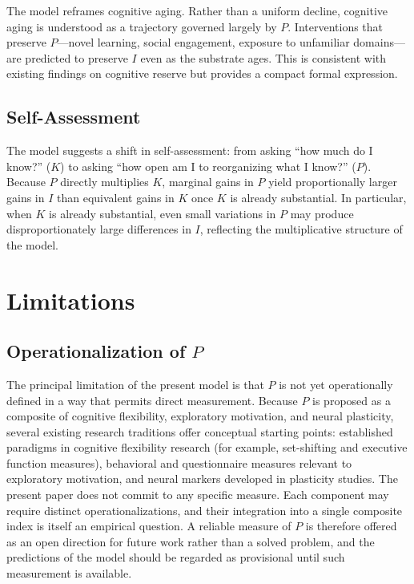 \documentclass[11pt, a4paper]{article}
\begin{document}
The model reframes cognitive aging. Rather than a uniform decline, cognitive aging is understood as a trajectory governed largely by $P$. Interventions that preserve $P$---novel learning, social engagement, exposure to unfamiliar domains---are predicted to preserve $I$ even as the substrate ages. This is consistent with existing findings on cognitive reserve but provides a compact formal expression.

\subsection{Self-Assessment}

The model suggests a shift in self-assessment: from asking ``how much do I know?'' ($K$) to asking ``how open am I to reorganizing what I know?'' ($P$). Because $P$ directly multiplies $K$, marginal gains in $P$ yield proportionally larger gains in $I$ than equivalent gains in $K$ once $K$ is already substantial. In particular, when $K$ is already substantial, even small variations in $P$ may produce disproportionately large differences in $I$, reflecting the multiplicative structure of the model.

\section{Limitations}

\subsection{Operationalization of $P$}

The principal limitation of the present model is that $P$ is not yet operationally defined in a way that permits direct measurement. Because $P$ is proposed as a composite of cognitive flexibility, exploratory motivation, and neural plasticity, several existing research traditions offer conceptual starting points: established paradigms in cognitive flexibility research (for example, set-shifting and executive function measures), behavioral and questionnaire measures relevant to exploratory motivation, and neural markers developed in plasticity studies. The present paper does not commit to any specific measure. Each component may require distinct operationalizations, and their integration into a single composite index is itself an empirical question. A reliable measure of $P$ is therefore offered as an open direction for future work rather than a solved problem, and the predictions of the model should be regarded as provisional until such measurement is available.
\end{document}
